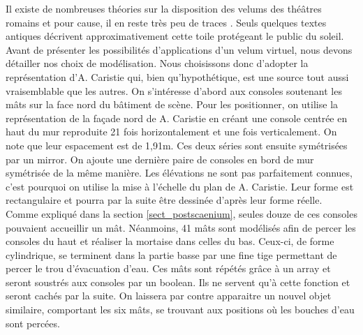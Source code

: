 Il existe de nombreuses théories sur la disposition des \glspl{velum} des théâtres romains et pour cause, il en reste très peu de traces \cite[IV, 70]{lucrece}. Seuls quelques textes antiques décrivent approximativement cette toile protégeant le public du soleil. Avant de présenter les possibilités d'applications d'un \gls{velum} virtuel, nous devons détailler nos choix de modélisation. Nous choisissons donc d'adopter la représentation d'A. Caristie \cite[Pl. VI]{orangePl} qui, bien qu'hypothétique, est une source tout aussi vraisemblable que les autres. On s'intéresse d'abord aux consoles soutenant les mâts sur la face nord du bâtiment de scène. Pour les positionner, on utilise la représentation de la façade nord de A. Caristie \cite[Pl. III]{orangePl} en créant une console centrée en haut du mur reproduite 21 fois horizontalement et une fois verticalement. On note que leur espacement est de 1,91m. Ces deux séries sont ensuite symétrisées par un \gls{mirror}. On ajoute une dernière paire de consoles en bord de mur symétrisée de la même manière. Les élévations ne sont pas parfaitement connues, c'est pourquoi on utilise la mise à l'échelle du plan de A. Caristie. Leur forme est rectangulaire et pourra par la suite être dessinée d'après leur forme réelle. Comme expliqué dans la section \ref{sect_postscaenium}, seules douze de ces consoles pouvaient accueillir un mât. Néanmoins, 41 mâts sont modélisés afin de percer les consoles du haut et réaliser la mortaise dans celles du bas. Ceux-ci, de forme cylindrique, se terminent dans la partie basse par une fine tige permettant de percer le trou d'évacuation d'eau. Ces mâts sont répétés grâce à un \gls{array} et seront soustrés aux consoles par un \gls{boolean}. Ils ne servent qu'à cette fonction et seront cachés par la suite. On laissera par contre apparaitre un nouvel objet similaire, comportant les six mâts, se trouvant aux positions où les bouches d'eau sont percées. 

